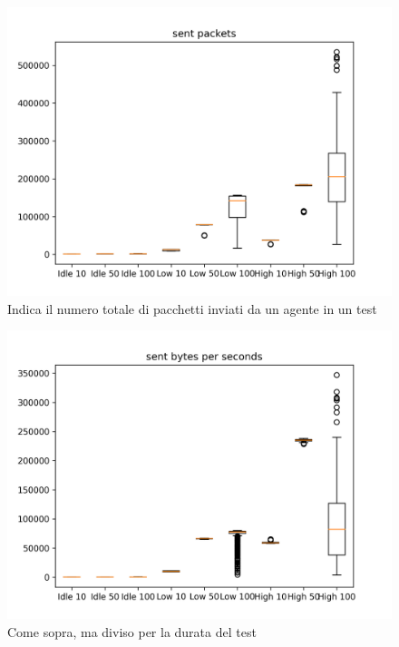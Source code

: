 \documentclass[12pt, a4paper]{article}
\begin{document}
\begin{figure}[H]
    \includegraphics[width=\linewidth, height=0.4\textheight, keepaspectratio]{graphs/sent packets.png}
    \caption{Indica il numero totale di pacchetti inviati da un agente in un test}
    \label{fig:sp}
\end{figure}

\begin{figure}[H]
    \includegraphics[width=\linewidth, height=0.4\textheight, keepaspectratio]{graphs/sent bytes per seconds.png}
    \caption{Come sopra, ma diviso per la durata del test}
    \label{fig:sbps}
\end{figure}
\end{document}
